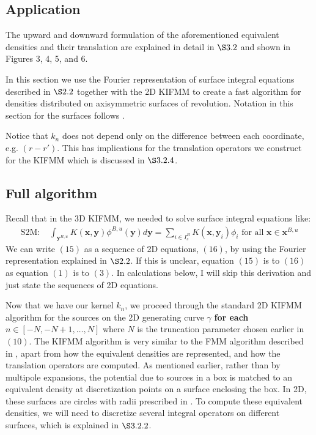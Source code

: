 
\subsection{Application}
The upward and downward formulation of the aforementioned equivalent densities and their translation are explained in detail in $\S3.2$ and shown in Figures 3, 4, 5, and 6.

In this section we use the Fourier representation of surface integral equations described in $\S2.2$ together with the 2D KIFMM to create a fast algorithm for densities distributed on axisymmetric surfaces of revolution. Notation in this section for the surfaces follows \cite{YBZ}.

Notice that $k_n$ does not depend only on the difference between each coordinate, e.g. $(r-r')$. This has implications for the translation operators we construct for the KIFMM which is discussed in $\S3.2.4$.

\subsection{Full algorithm}
Recall that in the 3D KIFMM, we needed to solve surface integral equations like:
\begin{align}
\mbox{S2M: }&\int_{\mathbf{y}^{B,u}}{K(\mathbf{x},\mathbf{y})}\phi^{B,u}{(\mathbf{y})}d\mathbf{y}=\sum\limits_{i\in I_s^B} K(\mathbf{x},\mathbf{y}_i)\phi_i\mbox{ for all }\mathbf{x}\in\mathbf{x}^{B,u}
\end{align}
We can write $(15)$ as a sequence of 2D equations, $(16)$, by using the Fourier representation explained in $\S2.2$. If this is unclear, equation $(15)$ is to $(16)$ as equation $(1)$ is to $(3)$. In calculations below, I will skip this derivation and just state the sequences of 2D equations.

Now that we have our kernel $k_n$, we proceed through the standard 2D KIFMM algorithm for the sources on the 2D generating curve $\gamma$ \textbf{for each} $n\in[-N,-N+1,\dots,N]$ where $N$ is the truncation parameter chosen earlier in $(10)$. The KIFMM algorithm is very similar to the FMM algorithm described in \cite{CGR}, apart from how the equivalent densities are represented, and how the translation operators are computed. As mentioned earlier, rather than by multipole expansions, the potential due to sources in a box is matched to an equivalent density at discretization points on a surface enclosing the box. In 2D, these surfaces are circles with radii prescribed in \cite{YBZ}. To compute these equivalent densities, we will need to discretize several integral operators on different surfaces, which is explained in $\S3.2.2$.

